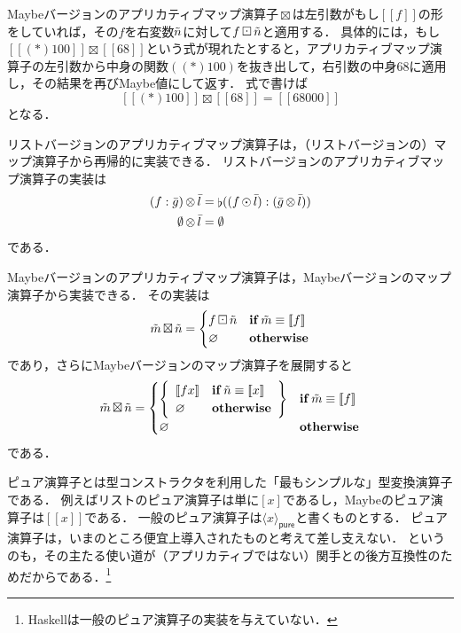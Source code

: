 \documentclass[twocolumn]{jsbook}
\def\[{[\![}
\def\]{]\!]}
\DeclareMathOperator{\hsklApplicativeListMap}{\otimes}
\DeclareMathOperator{\hsklApplicativeMaybeMap}{\boxtimes}
\DeclareMathOperator{\hsklConcat}{\flat}
\DeclareMathOperator{\hsklMap}{\odot}
\DeclareMathOperator{\hsklMaybeMap}{\boxdot}
\newcommand{\hsklEmptyList}{\emptyset}
\newcommand{\hsklNothing}{\varnothing}
\newcommand{\hsklJust}[1]{\[#1\]}
\newcommand{\hsklList}[1]{\Bar{#1}}
\newcommand{\hsklMaybe}[1]{\Tilde{#1}}
\newcommand{\hsklPure}[1]{\langle#1\rangle_\textsf{pure}}
\newcommand{\mathKeyword}[1]{\mathbf{#1}}
\DeclareMathOperator{\mathIf}{\mathKeyword{if}}
\newcommand{\mathOtherwise}{\mathKeyword{otherwise}}
\begin{document}
Maybeバージョンのアプリカティブマップ演算子$\hsklApplicativeMaybeMap$は左引数がもし$\hsklJust{f}$の形をしていれば，その$f$を右変数$\hsklMaybe{n}$に対して$f\hsklMaybeMap\hsklMaybe{n}$と適用する．
具体的には，もし$\hsklJust{(*)100}\hsklApplicativeMaybeMap{}\hsklJust{68}$という式が現れたとすると，アプリカティブマップ演算子の左引数から中身の関数$((*)100)$を抜き出して，右引数の中身$68$に適用し，その結果を再びMaybe値にして返す．
式で書けば
$$\hsklJust{(*)100}\hsklApplicativeMaybeMap{}\hsklJust{68}=\hsklJust{68000}$$
となる．

リストバージョンのアプリカティブマップ演算子は，（リストバージョンの）マップ演算子から再帰的に実装できる．
リストバージョンのアプリカティブマップ演算子の実装は
\begin{align*}
(f:\hsklList{g})\hsklApplicativeListMap\hsklList{l}&=\hsklConcat((f\hsklMap\hsklList{l}):(\hsklList{g}\hsklApplicativeListMap\hsklList{l}))\\
\hsklEmptyList\hsklApplicativeListMap\hsklList{l}&=\hsklEmptyList
\end{align*}
である．

Maybeバージョンのアプリカティブマップ演算子は，Maybeバージョンのマップ演算子から実装できる．
その実装は
\begin{equation*}
\hsklMaybe{m}\hsklApplicativeMaybeMap\hsklMaybe{n}=\begin{cases}
f\hsklMaybeMap\hsklMaybe{n}&\mathIf\hsklMaybe{m}\equiv\hsklJust{f}\\
\hsklNothing&\mathOtherwise
\end{cases}
\end{equation*}
であり，さらにMaybeバージョンのマップ演算子を展開すると
\begin{equation*}
\hsklMaybe{m}\hsklApplicativeMaybeMap\hsklMaybe{n}=\begin{cases}
\left\{
\begin{array}{ll}
\hsklJust{fx}&\mathIf\hsklMaybe{n}\equiv\hsklJust{x}\\
\hsklNothing&\mathOtherwise
\end{array}\right\}&\mathIf\hsklMaybe{m}\equiv\hsklJust{f}\\
\hsklNothing&\mathOtherwise
\end{cases}
\end{equation*}
である．

ピュア演算子とは型コンストラクタを利用した「最もシンプルな」型変換演算子である．
例えばリストのピュア演算子は単に$[x]$であるし，Maybeのピュア演算子は$\hsklJust{x}$である．
一般のピュア演算子は$\hsklPure{x}$と書くものとする．
ピュア演算子は，いまのところ便宜上導入されたものと考えて差し支えない．
というのも，その主たる使い道が（アプリカティブではない）関手との後方互換性のためだからである．\footnote{Haskellは一般のピュア演算子の実装を与えていない．}
\end{document}
